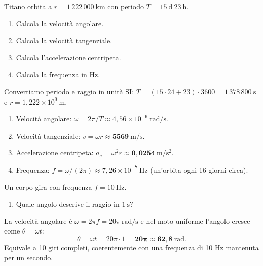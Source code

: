\begin{question}[ID=1.9, subtitle={Titano — luna di Saturno: velocità angolare, tangenziale e centripeta}, tags={moto circolare, satellite}, difficulty=media]
Titano orbita a $r = 1\,222\,000\ \mathrm{km}$ con periodo $T = 15\ \mathrm{d}\ 23\ \mathrm{h}$.
\begin{enumerate}
\item Calcola la velocità angolare.
\item Calcola la velocità tangenziale.
\item Calcola l'accelerazione centripeta.
\item Calcola la frequenza in Hz.
\end{enumerate}
\begin{solution}
Convertiamo periodo e raggio in unità SI: $T = (15\cdot 24 + 23)\cdot 3600 = 1\,378\,800\ \mathrm{s}$ e $r = 1{,}222\times10^9\ \mathrm{m}$.
\begin{enumerate}
\item Velocità angolare: $\omega = 2\pi/T \approx 4{,}56\times10^{-6}\ \mathrm{rad/s}$.
\item Velocità tangenziale: $v = \omega r \approx \mathbf{5569\ \mathrm{m/s}}$.
\item Accelerazione centripeta: $a_c = \omega^2 r \approx \mathbf{0{,}0254\ \mathrm{m/s^2}}$.
\item Frequenza: $f = \omega/(2\pi) \approx 7{,}26\times10^{-7}\ \mathrm{Hz}$ (un'orbita ogni 16 giorni circa).
\end{enumerate}
\end{solution}
\end{question}


\begin{question}[ID=1.10, subtitle={Corpo con frequenza 10 Hz — angolo descritto in 1 s}, tags={moto circolare, velocità angolare}, difficulty=facile]
Un corpo gira con frequenza $f = 10\ \mathrm{Hz}$.
\begin{enumerate}
\item Quale angolo descrive il raggio in $1\ \mathrm{s}$?
\end{enumerate}
\begin{solution}
La velocità angolare è $\omega = 2\pi f = 20\pi\ \mathrm{rad/s}$ e nel moto uniforme l'angolo cresce come $\theta = \omega t$:
\[
\theta = \omega t = 20\pi\cdot 1 = \mathbf{20\pi \approx 62{,}8\ \mathrm{rad}}.
\]
Equivale a 10 giri completi, coerentemente con una frequenza di 10 Hz mantenuta per un secondo.
\end{solution}
\end{question}

